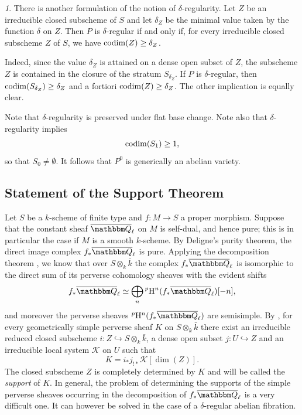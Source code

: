 \documentclass[12pt,english]{smfart}
\numberwithin{equation}{subsection}
\theoremstyle{remark}
\newtheorem{numero}[equation]{}
\newcommand\calK{{\mathcal K}}
\newcommand\QQ{{\mathbbm Q}}
\newcommand\rmH{{\rm H}}
\newcommand\Ql{{\overline\QQ_\ell}}
\begin{document}
\begin{numero}\label{delta regulier bis}
There is another formulation of the notion of $\delta$-regularity. Let $Z$ be an irreducible closed subscheme of $S$ and let $\delta_Z$ be the minimal value taken by the function $\delta$ on $Z$. Then $P$ is $\delta$-regular if and only if, for every irreducible closed subscheme $Z$ of $S$, we have ${\rm codim}(Z)\geq \delta_Z$.

Indeed, since the value $\delta_Z$ is attained on a dense open subset of $Z$, the subscheme $Z$ is contained in the closure of the stratum $S_{\delta_Z}$. If $P$ is $\delta$-regular, then ${\rm codim}(S_{\delta_Z})\geq \delta_Z$ and a fortiori ${\rm codim}(Z)\geq \delta_Z$. The other implication is equally clear.

Note that $\delta$-regularity is preserved under flat base change. Note also that $\delta$-regularity implies
$${\rm codim}(S_1)\geq 1,$$
so that $S_0\not=\emptyset$. It follows that $P^0$ is generically an abelian variety.
\end{numero}

\subsection{Statement of the Support Theorem}\label{subsection : support general}

Let $S$ be a $k$-scheme of finite type and $f:M\rightarrow S$ a proper morphism. Suppose that the constant sheaf $\Ql$ on $M$ is self-dual, and hence pure; this is in particular the case if $M$ is a smooth $k$-scheme. By Deligne's purity theorem, the direct image complex $f_*\Ql$ is pure. Applying the decomposition theorem \cite{BBD}, we know that over $S\otimes_k\bar k$ the complex $f_*\Ql$ is isomorphic to the direct sum of its perverse cohomology sheaves with the evident shifts
$$f_*\Ql \simeq \bigoplus_n {}^p\rmH^n(f_*\Ql)[-n],$$
and moreover the perverse sheaves ${}^p\rmH^n(f_*\Ql)$ are semisimple. By \cite{BBD}, for every geometrically simple perverse sheaf $K$ on $S\otimes_k\bar k$ there exist an irreducible reduced closed subscheme $i:Z\hookrightarrow S\otimes_k\bar k$, a dense open subset $j:U\hookrightarrow Z$ and an irreducible local system $\calK$ on $U$ such that
$$K=i_* j_{!*} \calK[\dim(Z)].$$
The closed subscheme $Z$ is completely determined by $K$ and will be called the {\em support} of $K$. In general, the problem of determining the supports of the simple perverse sheaves occurring in the decomposition of $f_*\Ql$ is a very difficult one. It can however be solved in the case of a $\delta$-regular abelian fibration.
\end{document}
